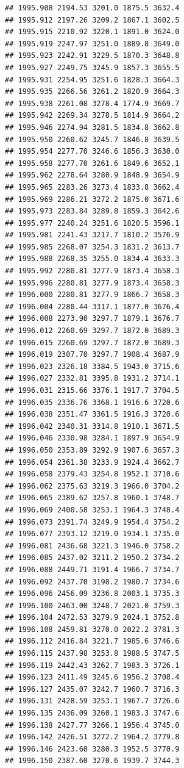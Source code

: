 \documentclass[
]{book}
\begin{document}
\begin{verbatim}
## 1995.908 2194.53 3201.0 1875.5 3632.4
## 1995.912 2197.26 3209.2 1867.1 3602.5
## 1995.915 2210.92 3220.1 1891.0 3624.0
## 1995.919 2247.97 3251.0 1889.8 3649.0
## 1995.923 2242.91 3229.5 1870.3 3648.8
## 1995.927 2249.75 3245.9 1857.3 3655.5
## 1995.931 2254.95 3251.6 1828.3 3664.3
## 1995.935 2266.56 3261.2 1820.9 3664.3
## 1995.938 2261.08 3278.4 1774.9 3669.7
## 1995.942 2269.34 3278.5 1814.9 3664.2
## 1995.946 2274.94 3281.5 1834.8 3662.8
## 1995.950 2260.62 3245.7 1846.8 3639.5
## 1995.954 2277.70 3246.6 1856.3 3630.0
## 1995.958 2277.70 3261.6 1849.6 3652.1
## 1995.962 2278.64 3280.9 1848.9 3654.9
## 1995.965 2283.26 3273.4 1833.8 3662.4
## 1995.969 2286.21 3272.2 1875.0 3671.6
## 1995.973 2283.84 3289.8 1859.3 3642.6
## 1995.977 2240.24 3251.6 1820.5 3596.1
## 1995.981 2241.43 3217.7 1810.2 3576.9
## 1995.985 2268.07 3254.3 1831.2 3613.7
## 1995.988 2268.35 3255.0 1834.4 3633.3
## 1995.992 2280.81 3277.9 1873.4 3658.3
## 1995.996 2280.81 3277.9 1873.4 3658.3
## 1996.000 2280.81 3277.9 1866.7 3658.3
## 1996.004 2280.44 3317.1 1877.0 3676.4
## 1996.008 2273.90 3297.7 1879.1 3676.7
## 1996.012 2260.69 3297.7 1872.0 3689.3
## 1996.015 2260.69 3297.7 1872.0 3689.3
## 1996.019 2307.70 3297.7 1908.4 3687.9
## 1996.023 2326.18 3384.5 1943.0 3715.6
## 1996.027 2332.81 3395.8 1931.2 3714.1
## 1996.031 2315.66 3376.1 1917.7 3704.5
## 1996.035 2336.76 3368.1 1916.6 3720.6
## 1996.038 2351.47 3361.5 1916.3 3720.6
## 1996.042 2340.31 3314.8 1910.1 3671.5
## 1996.046 2330.98 3284.1 1897.9 3654.9
## 1996.050 2353.89 3292.9 1907.6 3657.3
## 1996.054 2361.38 3233.9 1924.4 3662.7
## 1996.058 2379.43 3254.8 1952.1 3710.6
## 1996.062 2375.63 3219.3 1966.0 3704.2
## 1996.065 2389.62 3257.8 1960.1 3748.7
## 1996.069 2400.58 3253.1 1964.3 3748.4
## 1996.073 2391.74 3249.9 1954.4 3754.2
## 1996.077 2393.12 3219.0 1934.1 3735.0
## 1996.081 2436.68 3221.3 1946.0 3758.2
## 1996.085 2437.02 3211.2 1950.2 3734.2
## 1996.088 2449.71 3191.4 1966.7 3734.7
## 1996.092 2437.70 3198.2 1980.7 3734.6
## 1996.096 2456.09 3236.8 2003.1 3735.3
## 1996.100 2463.00 3248.7 2021.0 3759.3
## 1996.104 2472.53 3279.9 2024.1 3752.8
## 1996.108 2459.81 3270.0 2022.2 3781.3
## 1996.112 2416.84 3221.7 1985.6 3746.6
## 1996.115 2437.98 3253.8 1988.5 3747.5
## 1996.119 2442.43 3262.7 1983.3 3726.1
## 1996.123 2411.49 3245.6 1956.2 3708.4
## 1996.127 2435.07 3242.7 1960.7 3716.3
## 1996.131 2428.59 3253.1 1967.7 3726.6
## 1996.135 2436.09 3260.1 1983.3 3747.6
## 1996.138 2427.77 3266.1 1956.4 3745.0
## 1996.142 2426.51 3272.2 1964.2 3779.8
## 1996.146 2423.60 3280.3 1952.5 3770.9
## 1996.150 2387.60 3270.6 1939.7 3744.3

\end{verbatim}
\end{document}

